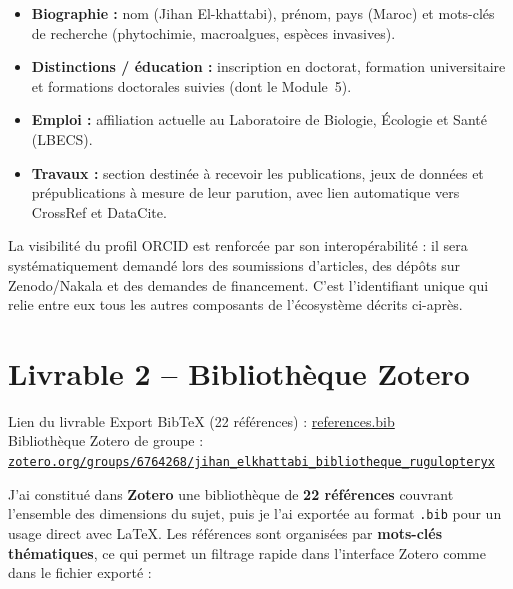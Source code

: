 \documentclass[11pt,a4paper]{article}
\begin{document}
\begin{itemize}
  \item \textbf{Biographie :} nom (Jihan El-khattabi), prénom, pays (Maroc) et mots-clés
        de recherche (phytochimie, macroalgues, espèces invasives).
  \item \textbf{Distinctions / éducation :} inscription en doctorat, formation
        universitaire et formations doctorales suivies (dont le Module~5).
  \item \textbf{Emploi :} affiliation actuelle au Laboratoire de Biologie, Écologie et
        Santé (LBECS).
  \item \textbf{Travaux :} section destinée à recevoir les publications, jeux de
        données et prépublications à mesure de leur parution, avec lien automatique
        vers CrossRef et DataCite.
\end{itemize}

La visibilité du profil ORCID est renforcée par son interopérabilité : il sera
systématiquement demandé lors des soumissions d'articles, des dépôts sur Zenodo/Nakala
et des demandes de financement. C'est l'identifiant unique qui relie entre eux tous
les autres composants de l'écosystème décrits ci-après.

\section{Livrable 2 -- Bibliothèque Zotero}
\begin{lienbox}{Lien du livrable}
Export BibTeX (22 références) :
\href{https://github.com/JihanElkhattabi/rugulopteryx-okamurae-these/blob/main/references.bib}{references.bib}\\
Bibliothèque Zotero de groupe :
\href{https://www.zotero.org/groups/6764268/jihan_elkhattabi_bibliotheque_rugulopteryx}{\nolinkurl{zotero.org/groups/6764268/jihan_elkhattabi_bibliotheque_rugulopteryx}}
\end{lienbox}

J'ai constitué dans \textbf{Zotero} une bibliothèque de \textbf{22 références}
couvrant l'ensemble des dimensions du sujet, puis je l'ai exportée au format
\texttt{.bib} pour un usage direct avec LaTeX. Les références sont organisées par
\textbf{mots-clés thématiques}, ce qui permet un filtrage rapide dans l'interface
Zotero comme dans le fichier exporté :
\end{document}
